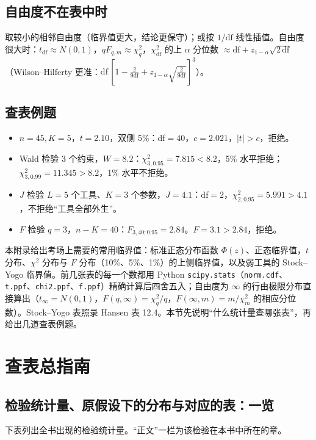 \subsection{自由度不在表中时}
取较小的相邻自由度（临界值更大，结论更保守）；或按 $1/\mathrm{df}$ 线性插值。自由度很大时：$t_{\mathrm{df}}\approx N(0,1)$，$qF_{q,m}\approx\chi^2_q$，$\chi^2_{\mathrm{df}}$ 的上 $\alpha$ 分位数 $\approx \mathrm{df}+z_{1-\alpha}\sqrt{2\,\mathrm{df}}$（Wilson--Hilferty 更准：$\mathrm{df}\,[1-\tfrac{2}{9\mathrm{df}}+z_{1-\alpha}\sqrt{\tfrac{2}{9\mathrm{df}}}]^3$）。
\subsection{查表例题}
\begin{itemize}
\item $n=45,K=5$，$t=2.10$，双侧 5\%：df$=40$，$c=2.021$，$|t|>c$，拒绝。
\item Wald 检验 3 个约束，$W=8.2$：$\chi^2_{3,0.95}=7.815<8.2$，5\% 水平拒绝；$\chi^2_{3,0.99}=11.345>8.2$，1\% 水平不拒绝。
\item $J$ 检验 $L=5$ 个工具、$K=3$ 个参数，$J=4.1$：df$=2$，$\chi^2_{2,0.95}=5.991>4.1$，不拒绝“工具全部外生”。
\item $F$ 检验 $q=3$，$n-K=40$：$F_{3,40;0.95}=2.84$。$F=3.1>2.84$，拒绝。
\end{itemize}
\else
本附录给出考场上需要的常用临界值：标准正态分布函数 $\Phi(z)$、正态临界值，$t$ 分布、$\chi^2$ 分布与 $F$ 分布（10\%、5\%、1\%）的上侧临界值，以及弱工具的 Stock--Yogo 临界值。前几张表的每一个数都用 Python \texttt{scipy.stats}（\texttt{norm.cdf}、\texttt{t.ppf}、\texttt{chi2.ppf}、\texttt{f.ppf}）精确计算后四舍五入；自由度为 $\infty$ 的行由极限分布直接算出（$t_\infty=N(0,1)$，$F(q,\infty)=\chi^2_q/q$，$F(\infty,m)=m/\chi^2_m$ 的相应分位数）。Stock--Yogo 表照录 Hansen 表 12.4。本节先说明“什么统计量查哪张表”，再给出几道查表例题。

\section{查表总指南}

\subsection{检验统计量、原假设下的分布与对应的表：一览}

下表列出全书出现的检验统计量。“正文”一栏为该检验在本书中所在的章。

